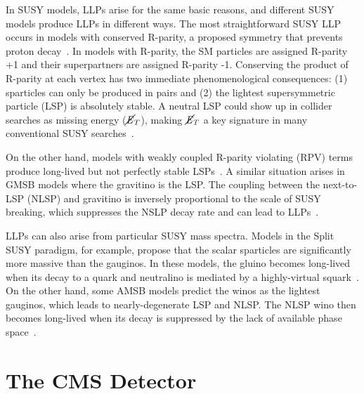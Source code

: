 \documentclass[12pt]{article}
\begin{document}
    In SUSY models, LLPs arise for the same basic reasons, and different SUSY models produce LLPs in different ways. The most straightforward SUSY LLP occurs in models with conserved R-parity, a proposed symmetry that prevents proton decay~\cite{primer}. In models with R-parity, the SM particles are assigned R-parity +1 and their superpartners are assigned R-parity -1. Conserving the product of R-parity at each vertex has two immediate phenomenological consequences: (1) sparticles can only be produced in pairs and (2) the lightest supersymmetric particle (LSP) is absolutely stable. A neutral LSP could show up in collider searches as missing energy ($\cancel{\it{E}}_{T}$), making $\cancel{\it{E}}_{T}$ a key signature in many conventional SUSY searches~\cite{primer}.

    On the other hand, models with weakly coupled R-parity violating (RPV) terms produce long-lived but not perfectly stable LSPs~\cite{fate}. A similar situation arises in GMSB models where the gravitino is the LSP. The coupling between the next-to-LSP (NLSP) and gravitino is inversely proportional to the scale of SUSY breaking, which suppresses the NSLP decay rate and can lead to LLPs~\cite{dimopoulos_low_energy}.


    LLPs can also arise from particular SUSY mass spectra. Models in the Split SUSY paradigm, for example, propose that the scalar sparticles are significantly more massive than the gauginos. In these models, the gluino becomes long-lived when its decay to a quark and neutralino is mediated by a highly-virtual squark~\cite{kilian_split}.  On the other hand, some AMSB models predict the winos as the lightest gauginos, which leads to nearly-degenerate LSP and NLSP. The NLSP wino then becomes long-lived when its decay is suppressed by the lack of available phase space~\cite{randall_sundrum_out_of_this_world}.


\section{The CMS Detector}
\end{document}
